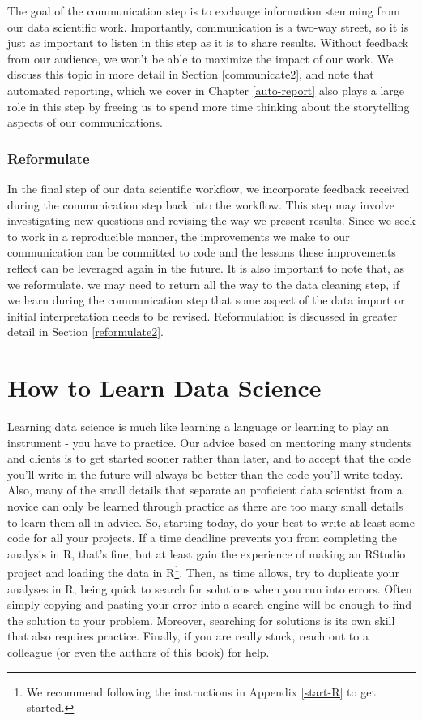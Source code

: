 \documentclass[
]{book}
\begin{document}
The goal of the communication step is to exchange information stemming from our data scientific work. Importantly, communication is a two-way street, so it is just as important to listen in this step as it is to share results. Without feedback from our audience, we won't be able to maximize the impact of our work. We discuss this topic in more detail in Section \ref{communicate2}, and note that automated reporting, which we cover in Chapter \ref{auto-report} also plays a large role in this step by freeing us to spend more time thinking about the storytelling aspects of our communications.

\hypertarget{reformulate}{%
\subsubsection{Reformulate}\label{reformulate}}

In the final step of our data scientific workflow, we incorporate feedback received during the communication step back into the workflow. This step may involve investigating new questions and revising the way we present results. Since we seek to work in a reproducible manner, the improvements we make to our communication can be committed to code and the lessons these improvements reflect can be leveraged again in the future. It is also important to note that, as we reformulate, we may need to return all the way to the data cleaning step, if we learn during the communication step that some aspect of the data import or initial interpretation needs to be revised. Reformulation is discussed in greater detail in Section \ref{reformulate2}.

\hypertarget{how-to-learn-data-science}{%
\section{How to Learn Data Science}\label{how-to-learn-data-science}}

Learning data science is much like learning a language or learning to play an instrument - you have to practice. Our advice based on mentoring many students and clients is to get started sooner rather than later, and to accept that the code you'll write in the future will always be better than the code you'll write today. Also, many of the small details that separate an proficient data scientist from a novice can only be learned through practice as there are too many small details to learn them all in advice. So, starting today, do your best to write at least some code for all your projects. If a time deadline prevents you from completing the analysis in R, that's fine, but at least gain the experience of making an RStudio project and loading the data in R\footnote{We recommend following the instructions in Appendix \ref{start-R} to get started.}. Then, as time allows, try to duplicate your analyses in R, being quick to search for solutions when you run into errors. Often simply copying and pasting your error into a search engine will be enough to find the solution to your problem. Moreover, searching for solutions is its own skill that also requires practice. Finally, if you are really stuck, reach out to a colleague (or even the authors of this book) for help.
\end{document}
